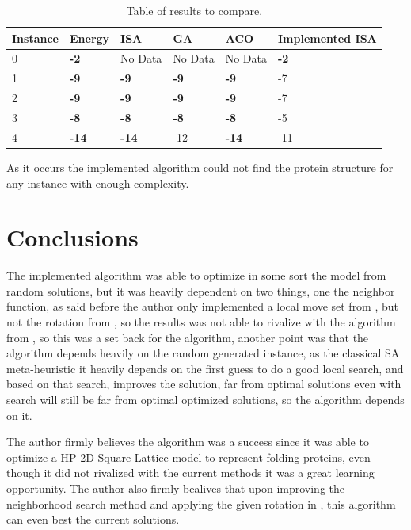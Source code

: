 \documentclass[10pt]{article}
\begin{document}
\begin{table}[!htb]
\centering
\begin{tabularx}{1.0\textwidth}{ C | C | C | C | C | C }
\toprule
Instance & Energy & ISA & GA & ACO & Implemented ISA \\ 
 & \textbf{-2} & No Data & No Data & No Data & \textbf{-2} \\ 
1 & \textbf{-9} & \textbf{-9} & \textbf{-9} & \textbf{-9} & -7 \\ 
2 & \textbf{-9} & \textbf{-9} & \textbf{-9} & \textbf{-9} & -7 \\ 
3 & \textbf{-8} & \textbf{-8} & \textbf{-8} & \textbf{-8} & -5 \\ 
4 & \textbf{-14} & \textbf{-14} & -12 & \textbf{-14} & -11 \\ 
\bottomrule
\end{tabularx}
\label{table:tab1}
\caption{Table of results to compare.}
\end{table}

As it occurs the implemented algorithm could not find the protein structure for any instance with enough complexity.

\section{Conclusions}\label{sec:4}

The implemented algorithm was able to optimize in some sort the model from random solutions, but it was heavily dependent on two things, one the neighbor function, as said before the author only implemented a local move set from \cite{LocalMoveSet}, but not the rotation from \cite{LocalRotation}, so the results was not able to rivalize with the algorithm from \cite{SaInPFP}, so this was a set back for the algorithm, another point was that the algorithm depends heavily on the random generated instance, as the classical SA  meta-heuristic it heavily depends on the first guess to do a good local search, and based on that search, improves the solution, far from optimal solutions even with search will still be far from optimal optimized solutions, so the algorithm depends on it.

The author firmly believes the algorithm was a success since it was able to optimize a HP 2D Square Lattice model to represent folding proteins, even though it did not rivalized with the current methods it was a great learning opportunity. The author also firmly bealives that upon improving the neighborhood search method and applying the given rotation in \cite{LocalRotation}, this algorithm can even best the current solutions.


\newpage

\end{document}
